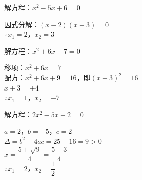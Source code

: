 \documentclass[a4paper,12pt]{ctexart}
\begin{document}



\begin{example}
解方程：$x^2-5x+6=0$
\end{example}
\begin{solution}
因式分解：$(x-2)(x-3)=0$\\
$\therefore x_1=2$，$x_2=3$
\end{solution}


\begin{example}
解方程：$x^2+6x-7=0$
\end{example}
\begin{solution}
移项：$x^2+6x=7$\\
配方：$x^2+6x+9=16$，即$(x+3)^2=16$\\
$x+3=\pm4$\\
$\therefore x_1=1$，$x_2=-7$
\end{solution}



\begin{example}
解方程：$2x^2-5x+2=0$
\end{example}
\begin{solution}
$a=2$，$b=-5$，$c=2$\\
$\Delta=b^2-4ac=25-16=9>0$\\
$x=\dfrac{5\pm\sqrt9}{4}=\dfrac{5\pm3}{4}$\\
$\therefore x_1=2$，$x_2=\dfrac12$
\end{solution}


\end{document}
